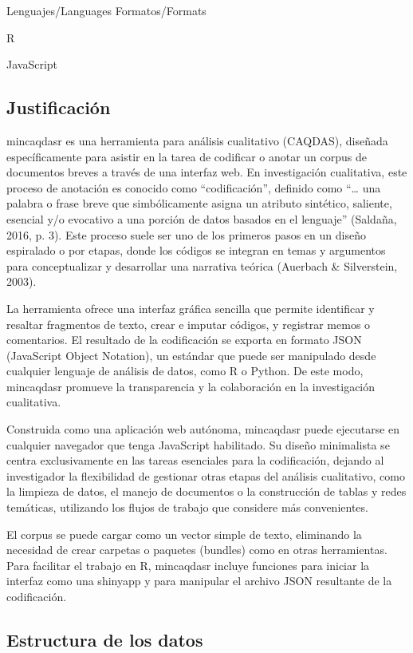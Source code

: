 \documentclass[
]{article}
\begin{document}
Lenguajes/Languages Formatos/Formats

R

JavaScript

\subsection{Justificación}\label{justificaciuxf3n}

mincaqdasr es una herramienta para análisis cualitativo (CAQDAS),
diseñada específicamente para asistir en la tarea de codificar o anotar
un corpus de documentos breves a través de una interfaz web. En
investigación cualitativa, este proceso de anotación es conocido como
``codificación'', definido como ``\ldots{} una palabra o frase breve que
simbólicamente asigna un atributo sintético, saliente, esencial y/o
evocativo a una porción de datos basados en el lenguaje'' (Saldaña,
2016, p. 3). Este proceso suele ser uno de los primeros pasos en un
diseño espiralado o por etapas, donde los códigos se integran en temas y
argumentos para conceptualizar y desarrollar una narrativa teórica
(Auerbach \& Silverstein, 2003).

La herramienta ofrece una interfaz gráfica sencilla que permite
identificar y resaltar fragmentos de texto, crear e imputar códigos, y
registrar memos o comentarios. El resultado de la codificación se
exporta en formato JSON (JavaScript Object Notation), un estándar que
puede ser manipulado desde cualquier lenguaje de análisis de datos, como
R o Python. De este modo, mincaqdasr promueve la transparencia y la
colaboración en la investigación cualitativa.

Construida como una aplicación web autónoma, mincaqdasr puede ejecutarse
en cualquier navegador que tenga JavaScript habilitado. Su diseño
minimalista se centra exclusivamente en las tareas esenciales para la
codificación, dejando al investigador la flexibilidad de gestionar otras
etapas del análisis cualitativo, como la limpieza de datos, el manejo de
documentos o la construcción de tablas y redes temáticas, utilizando los
flujos de trabajo que considere más convenientes.

El corpus se puede cargar como un vector simple de texto, eliminando la
necesidad de crear carpetas o paquetes (bundles) como en otras
herramientas. Para facilitar el trabajo en R, mincaqdasr incluye
funciones para iniciar la interfaz como una shinyapp y para manipular el
archivo JSON resultante de la codificación.

\subsection{Estructura de los datos}\label{estructura-de-los-datos}
\end{document}
